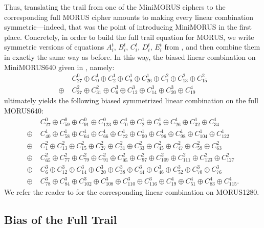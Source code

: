 \documentclass{llncs}
\newcommand{\cipher}[1]{\textsf{#1}}
\begin{document}
Thus, translating the trail from one of the \cipher{MiniMORUS} ciphers to the corresponding full \cipher{MORUS} cipher amounts to making every linear combination symmetric---indeed, that was the point of introducing \cipher{MiniMORUS} in the first place.
Concretely, in order to build the full trail equation for \cipher{MORUS}, we write symmetric versions of equations $A^t_i$, $B^t_i$, $C^t_i$, $D^t_i$, $E^t_i$ from , and then combine them in exactly the same way as before.
In this way, the biased linear combination on \cipher{MiniMORUS640} given in , namely:
\begin{align*}
&C^0_{27} \oplus C^1_{0} \oplus C^1_{2} \oplus C^1_{8} \oplus C^1_{26} \oplus C^2_{1} \oplus C^2_{13} \oplus C^2_{15}\\
\oplus\; &C^2_{27} \oplus C^2_{31} \oplus C^3_{6} \oplus C^3_{12} \oplus C^3_{14} \oplus C^3_{20} \oplus C^4_{19}
\end{align*}
ultimately yields the following biased symmetrized linear combination on the full \cipher{MORUS640}:
\begin{align*}
&C^0_{27} \oplus C^0_{59} \oplus C^0_{91} \oplus C^0_{123} \oplus C^1_{0} \oplus C^1_{2} \oplus C^1_{8} \oplus C^1_{26} \oplus C^1_{32} \oplus C^1_{34}\\
\oplus\; & C^1_{40} \oplus C^1_{58} \oplus C^1_{64} \oplus C^1_{66} \oplus C^1_{72} \oplus C^1_{90} \oplus C^1_{96} \oplus C^1_{98} \oplus C^1_{104} \oplus C^1_{122}\\
\oplus\; & C^2_{1} \oplus C^2_{13} \oplus C^2_{15} \oplus C^2_{27} \oplus C^2_{31} \oplus C^2_{33} \oplus C^2_{45} \oplus C^2_{47} \oplus C^2_{59} \oplus C^2_{63}\\
\oplus\; & C^2_{65} \oplus C^2_{77} \oplus C^2_{79} \oplus C^2_{91} \oplus C^2_{95} \oplus C^2_{97} \oplus C^2_{109} \oplus C^2_{111} \oplus C^2_{123} \oplus C^2_{127}\\
\oplus\; & C^3_{6} \oplus C^3_{12} \oplus C^3_{14} \oplus C^3_{20} \oplus C^3_{38} \oplus C^3_{44} \oplus C^3_{46} \oplus C^3_{52} \oplus C^3_{70} \oplus C^3_{76}\\
\oplus\; & C^3_{78} \oplus C^3_{84} \oplus C^3_{102} \oplus C^3_{108} \oplus C^3_{110} \oplus C^3_{116} \oplus C^4_{19} \oplus C^4_{51} \oplus C^4_{83} \oplus C^4_{115}.
\end{align*}
We refer the reader to  for the corresponding linear combination on \cipher{MORUS1280}.

\subsection{Bias of the Full Trail}
\end{document}
